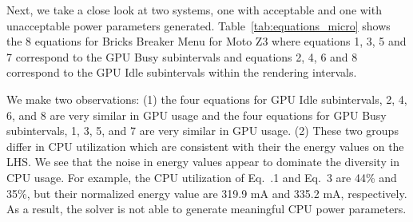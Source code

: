 Next, we take a close look at two systems, one with acceptable and one with unacceptable power parameters generated.
Table~\ref{tab:equations_micro} shows the 8 equations for 
Bricks Breaker Menu for Moto Z3 
where equations 1, 3, 5 and 7 correspond to the GPU Busy subintervals and 
equations 2, 4, 6 and 8 correspond to the GPU Idle subintervals within the rendering intervals. 

We make two  observations:
(1) the four equations for GPU Idle subintervals, 2, 4, 6, and 8 are very similar in GPU usage
and the four equations for GPU Busy subintervals, 1, 3, 5, and 7 are very similar in GPU usage. 
(2) These two groups differ in CPU utilization which are consistent with their
the energy values on the LHS.
We see that the noise in energy values appear to dominate the diversity in CPU usage. 
For example, the CPU utilization of Eq.~.1 and Eq.~3 are 44\% and 35\%,
but their normalized energy value are 319.9 mA and 335.2 mA, respectively. 
As a result, the solver is not able to generate meaningful CPU power parameters.

\fi


 